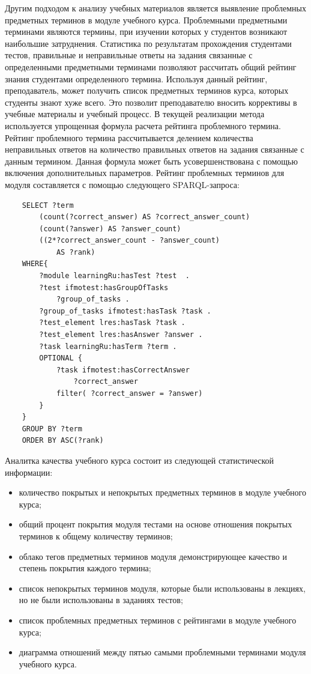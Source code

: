 Другим подходом к анализу учебных материалов является выявление проблемных предметных терминов в модуле учебного курса. Проблемными предметными терминами являются термины, при изучении которых у студентов возникают наибольшие затруднения. Статистика по результатам прохождения студентами тестов, правильные и неправильные ответы на задания связанные с определенными предметными терминами позволяют рассчитать общий рейтинг знания студентами определенного термина. Используя данный рейтинг, преподаватель, может получить список предметных терминов курса, которых студенты знают хуже всего. Это позволит преподавателю вносить коррективы в учебные материалы и учебный процесс. В текущей реализации метода используется упрощенная формула расчета рейтинга проблемного термина. Рейтинг проблемного термина рассчитывается делением количества неправильных ответов на количество правильных ответов на задания связанные с данным термином. Данная формула может быть усовершенствована с помощью включения дополнительных параметров. Рейтинг проблемных терминов для модуля составляется с помощью следующего  SPARQL-запроса:

\begin{verbatim}
    SELECT ?term 
        (count(?correct_answer) AS ?correct_answer_count)
        (count(?answer) AS ?answer_count)
        ((2*?correct_answer_count - ?answer_count) 
            AS ?rank) 
    WHERE{
        ?module learningRu:hasTest ?test  . 
        ?test ifmotest:hasGroupOfTasks 
            ?group_of_tasks .        
        ?group_of_tasks ifmotest:hasTask ?task .      
        ?test_element lres:hasTask ?task .
        ?test_element lres:hasAnswer ?answer .
        ?task learningRu:hasTerm ?term .       
        OPTIONAL { 
            ?task ifmotest:hasCorrectAnswer 
                ?correct_answer
            filter( ?correct_answer = ?answer)
        }         
    }
    GROUP BY ?term 
    ORDER BY ASC(?rank)
\end{verbatim}


Аналитка качества учебного курса состоит из следующей статистической информации:
\begin{itemize}
\item количество покрытых и непокрытых предметных терминов в модуле учебного курса;
\item общий процент покрытия модуля тестами на основе отношения покрытых терминов к общему количеству терминов;
\item облако тегов предметных терминов модуля демонстрирующее качество и степень покрытия каждого термина;
\item список непокрытых терминов модуля, которые были использованы в лекциях, но не были использованы в заданиях тестов;
\item список проблемных предметных терминов с рейтингами в модуле учебного курса;
\item диаграмма отношений между пятью самыми проблемными терминами модуля учебного курса.
\end{itemize}


